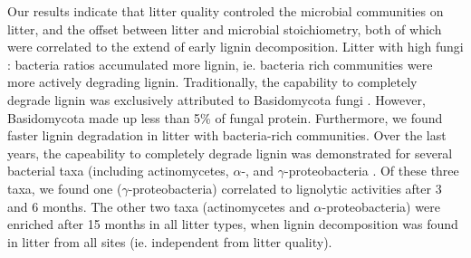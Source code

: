 

%
Our results indicate that litter quality controled the microbial communities on litter, and the offset between litter and microbial stoichiometry, both of which were correlated to the extend of early lignin decomposition. Litter with high fungi : bacteria ratios accumulated more lignin, ie. bacteria rich communities were more actively degrading lignin. Traditionally, the capability to completely degrade lignin was exclusively attributed to Basidomycota fungi \cite{Berg2008}. However, Basidomycota made up less than 5\% of fungal protein. Furthermore, we found faster lignin degradation in litter with bacteria-rich communities. Over the last years, the capeability to completely degrade lignin was demonstrated for several bacterial taxa (including actinomycetes, $\alpha$-, and $\gamma$-proteobacteria \cite{Bugg2011}. Of these three taxa, we found one ($\gamma$-proteobacteria) correlated to lignolytic activities after 3 and 6 months. The other two taxa (actinomycetes and $\alpha$-proteobacteria) were enriched after 15 months in all litter types, when lignin decomposition was found in litter from all sites (ie.  independent from litter quality).


